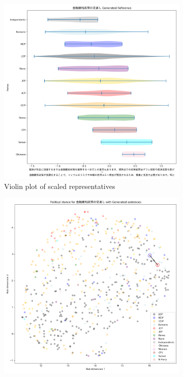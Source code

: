 \documentclass[final,5p,times,twocolumn,authoryear]{elsarticle}
\begin{document}
\begin{figure}[h]
\centering
    \begin{subfigure}{0.22\textwidth}
      \centering
      \includegraphics[width=1\linewidth]{figs/results/economy/金融緩和政策の見直し_gen_violin_plot.png}
      \caption{Violin plot of scaled representatives}
    \end{subfigure}
    \begin{subfigure}{0.22\textwidth}
      \centering
      \includegraphics[width=1\linewidth]{figs/results/economy/金融緩和政策の見直し_umap_gen.png}

\end{subfigure}
\end{figure}
\end{document}
